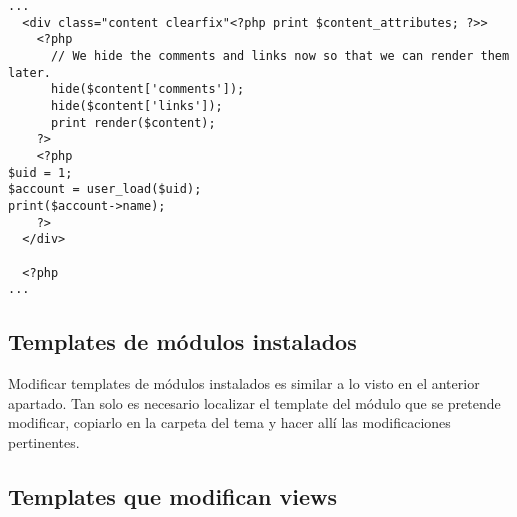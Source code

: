 \documentclass[11pt]{article}
\begin{document}
\begin{verbatim}
...
  <div class="content clearfix"<?php print $content_attributes; ?>>                                                           
    <?php                                                                                                                     
      // We hide the comments and links now so that we can render them later.                                                 
      hide($content['comments']);                                                                                             
      hide($content['links']);                                                                                                
      print render($content);                                                                                                 
    ?>                                                                                                                        
    <?php                                                                                                                     
$uid = 1;                                                                                                                     
$account = user_load($uid);                                                                                                   
print($account->name);                                                                                                        
    ?>                                                                                                                        
  </div>                                                                                                                      
                                                                                                                              
  <?php     
...
\end{verbatim}



\subsection{Templates de módulos instalados}
\label{sec-1.7}


Modificar templates de módulos instalados es similar a lo visto en el
anterior apartado. Tan solo es necesario localizar el template del
módulo que se pretende modificar, copiarlo en la carpeta del tema y
hacer allí las modificaciones pertinentes.

\subsection{Templates que modifican views}
\label{sec-1.8}
\end{document}

